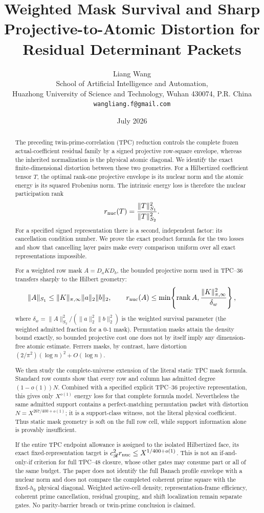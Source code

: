 \documentclass[11pt]{article}
\title{\bfseries Weighted Mask Survival and Sharp\\
Projective-to-Atomic Distortion for\\
Residual Determinant Packets}
\author{Liang Wang\\
\small School of Artificial Intelligence and Automation,\\[-2pt]
\small Huazhong University of Science and Technology, Wuhan 430074, P.R. China\\
\small \texttt{wangliang.f@gmail.com}}
\date{July 2026}
\theoremstyle{definition}
\theoremstyle{remark}
\begin{document}
\maketitle

\begin{abstract}
The preceding twin-prime-correlation (TPC) reduction controls the
complete frozen actual-coefficient residual family by a signed
projective row-square envelope, whereas the inherited normalization is
the physical atomic diagonal.  We identify the exact finite-dimensional
distortion between these two geometries.  For a Hilbertized coefficient
tensor \(T\), the optimal rank-one projective envelope is its nuclear
norm and the atomic energy is its squared Frobenius norm.  The intrinsic
energy loss is therefore the nuclear participation rank
\[
 r_{\rm nuc}(T)
 =\frac{\|T\|_{S_1}^2}{\|T\|_{S_2}^2}.
\]
For a specified signed representation there is a second, independent
factor: its cancellation condition number.  We prove the exact product
formula for the two losses and show that cancelling layer pairs make
every comparison uniform over all exact representations impossible.

For a weighted row mask \(A=D_aKD_b\), the bounded projective norm used
in TPC--36 transfers sharply to the Hilbert geometry:
\[
 \|A\|_{S_1}
 \le \|K\|_{\pi,\infty}\|a\|_2\|b\|_2,
 \qquad
 r_{\rm nuc}(A)
 \le \min\!\left\{\operatorname{rank}A,
 \frac{\|K\|_{\pi,\infty}^2}{\delta_w}\right\},
\]
where \(\delta_w=\|A\|_{S_2}^2/
(\|a\|_2^2\|b\|_2^2)\) is the weighted survival parameter (the weighted
admitted fraction for a \(0\)-\(1\) mask).  Permutation
masks attain the density bound exactly, so bounded projective cost one
does not by itself imply any dimension-free atomic estimate.  Ferrers
masks, by contrast, have distortion
\((2/\pi^2)(\log n)^2+O(\log n)\).

We then study the complete-universe extension of the literal static TPC
mask formula.  Standard row counts show that every row and
column has admitted degree \((1-o(1))N\).  Combined with a specified
explicit TPC--36 projective representation, this gives only
\(X^{o(1)}\) energy loss for that complete formula model.  Nevertheless
the same admitted
support contains a perfect-matching permutation packet with distortion
\(N=X^{267/400+o(1)}\); it is a support-class witness, not the literal
physical coefficient.  Thus static mask geometry is soft on the full
row cell, while support information alone is provably insufficient.

If the entire TPC endpoint allowance is assigned to the isolated
Hilbertized face, its exact fixed-representation target is
\(c_{\mathscr R}^2r_{\rm nuc}\le X^{1/400+o(1)}\).
This is not an if-and-only-if criterion for full TPC--48 closure, whose
other gates may consume part or all of the same budget.
The paper does not identify the full Banach profile envelope with a
nuclear norm and does not compare the completed coherent prime square
with the fixed-\(h_0\) physical diagonal.  Weighted active-cell density,
representation-frame efficiency, coherent prime cancellation,
residual grouping, and shift localization remain separate gates.  No
parity-barrier breach or twin-prime conclusion is claimed.
\end{abstract}
\end{document}

